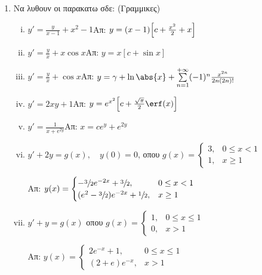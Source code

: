 



\everymath{\displaystyle}



\thispagestyle{empty}


\begin{center}
\end{center}

\vspace{\baselineskip}

\begin{enumerate}

\item Να λυθουν οι παρακατω σδε: (Γραμμικες)

\begin{enumerate}[i)]

\item $y'=\frac{y}{x-1}+x^2-1$\hfill Απ: $y=(x-1)\Bigl[c+\frac{x^2}{2}+x\Bigr]$
\item $y'=\frac{y}{x}+x\cos x$\hfill Απ: $y=x[c+\sin x]$
\item $y'=\frac{y}{x}+\cos x$\hfill Απ: $y=\gamma + \ln\abs{x}+\sum\limits_{n=1}^{+\infty}(-1)^n\frac{x^{2n}}{2n(2n)!}$
\item $y'=2xy+1$\hfill Απ: $y=e^{x^2}\Bigl[c+\frac{\sqrt{\pi}}{2}\erf(x)\Bigr]$
\item $y'=\frac{1}{x+e^{2y}}$\hfill Απ: $x=ce^y+e^{2y}$
\item $y'+2y=g(x),\quad y(0)=0$, οπου $g(x)=\begin{cases}3, & 0\leq x<1 \\ 1, & x\geq 1 \end{cases}$

\hfill  Απ: $y(x)=\begin{cases}-\sfrac{3}{2}e^{-2x}+\sfrac{3}{2}, & 0\leq x<1 \\ (e^2-\sfrac{3}{2})e^{-2x}+\sfrac{1}{2}, &  x\geq 1\end{cases}$
\item $y'+y=g(x)$ οπου $g(x)=\begin{cases}1, & 0\leq x\leq 1 \\ 0, & x>1\end{cases}$

\hfill Απ: $y(x)=\begin{cases} 2e^{-x}+1, & 0\leq x\leq 1 \\ (2+e)e^{-x}, & x>1\end{cases}$
\end{enumerate}


\end{enumerate}
